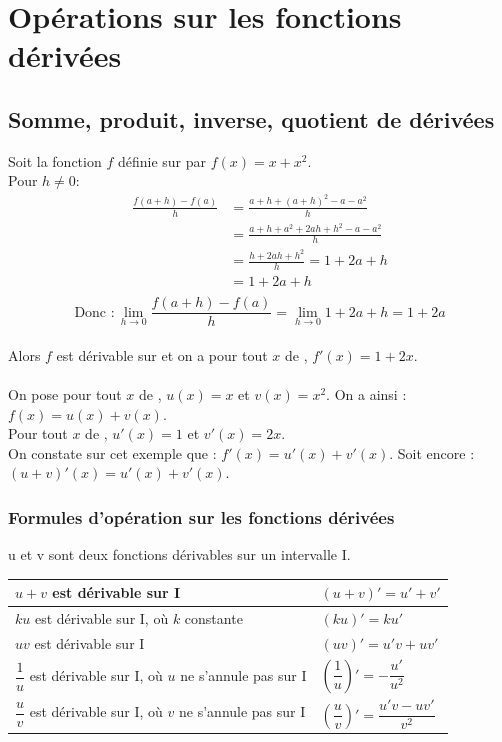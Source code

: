\section{Opérations sur les fonctions dérivées}
\subsection{Somme, produit, inverse, quotient de dérivées}
\begin{bexemple}
    Soit la fonction $f$ définie sur \R par  $f(x)=x+x^2$.\\
    Pour $h\neq0$:\\ 
    \begin{align*}
    	\frac{f(a+h)-f(a)}{h}&=\frac{a+h+(a+h)^2-a-a^2}{h}\\
    	&=\frac{a+h+a^2+2ah+h^2-a-a^2}{h}\\
    	&=\frac{h+2ah+h^2}{h}=1+2a+h\\
    	&=1+2a+h\\
    \end{align*}
    \[ \text{Donc }:\lim\limits_{h \rightarrow 0} \frac{f(a+h)-f(a)}{h} = \lim\limits_{h \rightarrow 0} 1+2a+h=1+2a\]
    \\
    Alors $f$ est dérivable sur \R et on a pour tout $x$ de \R, $f'(x)=1+2x$.\\
    \\
    On pose pour tout $x$ de \R, $u(x)=x$ et $v(x)=x^2$. On a ainsi : $f(x)=u(x)+v(x)$.\\
    Pour tout $x$ de \R, $u'(x)=1$ et $v'(x)=2x$.\\
    On constate sur cet exemple que : $f'(x)=u'(x)+v'(x)$. Soit encore : $(u+v)'(x)=u'(x)+v'(x)$.
\end{bexemple}
\subsubsection{Formules d'opération sur les fonctions dérivées}
u et v sont deux fonctions dérivables sur un intervalle I.

\begin{center}
	\setlength{\arrayrulewidth}{1pt}
	\renewcommand{\arraystretch}{2.5}
	\begin{tabular}{| >{}C{10cm} | >{}C{5cm} | }
		\hline$u+v$ est dérivable sur I & $(u+v)'=u'+v'$ \\
		\hline$ku$ est dérivable sur I, où $k$ constante & $(ku)'=ku'$ \\
		\hline$uv$ est dérivable sur I & $(uv)'=u'v+uv'$ \\
		\hline$\dfrac{1}{u}$ est dérivable sur I, où $u$ ne s'annule pas sur I & $\left(\dfrac{1}{u}\right)'=-\dfrac{u'}{u^2}$ \\
		\hline$\dfrac{u}{v}$ est dérivable sur I, où $v$ ne s'annule pas sur I & $\left(\dfrac{u}{v}\right)'=\dfrac{u'v-uv'}{v^2}$ \\
		\hline
	\end{tabular}
\end{center}

